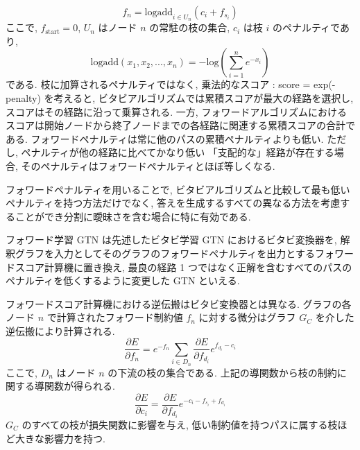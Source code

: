 \documentclass[twocolumn]{jarticle}     %
\begin{document}
\begin{equation}
  f_n = \mathrm{logadd}_{i \in U_n}(c_i + f_{s_i})
\end{equation}
ここで, $f_{\mathrm{start}} = 0$, $U_n$ はノード $n$ の常駐の枝の集合, $c_i$ は枝 $i$ のペナルティであり,
\begin{equation}
  \mathrm{logadd}(x_1, x_2,...,x_n) = -\mathrm{log}(\sum_{i=1}^{n}e^{-x_i})
\end{equation}
である.
枝に加算されるペナルティではなく, 乗法的なスコア : score = exp(- penalty) を考えると, ビタビアルゴリズムでは累積スコアが最大の経路を選択し, スコアはその経路に沿って乗算される. 一方, フォワードアルゴリズムにおけるスコアは開始ノードから終了ノードまでの各経路に関連する累積スコアの合計である. フォワードペナルティは常に他のパスの累積ペナルティよりも低い. ただし, ペナルティが他の経路に比べてかなり低い 「支配的な」経路が存在する場合, そのペナルティはフォワードペナルティとほぼ等しくなる. 
\par
フォワードペナルティを用いることで, ビタビアルゴリズムと比較して最も低いペナルティを持つ方法だけでなく, 答えを生成するすべての異なる方法を考慮することができ分割に曖昧さを含む場合に特に有効である. 
\par
フォワード学習 GTN は先述したビタビ学習 GTN におけるビタビ変換器を, 解釈グラフを入力としてそのグラフのフォワードペナルティを出力とするフォワードスコア計算機に置き換え, 最良の経路 1 つではなく正解を含むすべてのパスのペナルティを低くするように変更した GTN といえる.
\par
フォワードスコア計算機における逆伝搬はビタビ変換器とは異なる. グラフの各ノード $n$ で計算されたフォワード制約値 $f_n$ に対する微分はグラフ $G_C$ を介した逆伝搬により計算される.
\begin{equation}
  \frac{\partial E}{\partial f_n} = e^{-f_n} \sum_{i \in D_n}\frac{\partial E}{\partial f_{d_i}} e^{f_{d_i} - c_i}
\end{equation}
ここで, $D_n$ はノード $n$ の下流の枝の集合である. 上記の導関数から枝の制約に関する導関数が得られる. 
\begin{equation}
  \frac{\partial E}{\partial c_i} = \frac{\partial E}{\partial f_{d_i}} e^{- c_i - f_{s_i} + f_{d_i} }
\end{equation}
$G_C$ のすべての枝が損失関数に影響を与え, 低い制約値を持つパスに属する枝ほど大きな影響力を持つ. 
\end{document}
